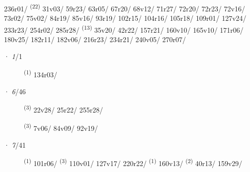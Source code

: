 \begin{description}
\mbox{236r01/} \textsuperscript{(22)} \mbox{31v03/} \mbox{59r23/} \mbox{63r05/} \mbox{67r20/} \mbox{68v12/} \mbox{71r27/} \mbox{72r20/} \mbox{72r23/} \mbox{72v16/} \mbox{73r02/} \mbox{75v02/} \mbox{84r19/} \mbox{85v16/} \mbox{93r19/} \mbox{102r15/} \mbox{104r16/} \mbox{105r18/} \mbox{109r01/} \mbox{127v24/} \mbox{233r23/} \mbox{254r02/} \mbox{285r28/} \textsuperscript{(13)} \mbox{35v20/} \mbox{42r22/} \mbox{157r21/} \mbox{160v10/} \mbox{165v10/} \mbox{171r06/} \mbox{180v25/} \mbox{182r11/} \mbox{182v06/} \mbox{216r23/} \mbox{234r21/} \mbox{240v05/} \mbox{270r07/}
\end{description}
\ENTRYEND
\noindent{} · \textit{1}/1 \LEMMALINE
\begin{description}
    \item[]  \textsuperscript{(1)} \mbox{134r03/}
\end{description}
\ENTRYEND
\noindent{} · \textit{6}/46 \LEMMALINE
\begin{description}
    \item[]  \textsuperscript{(3)} \mbox{22v28/} \mbox{25r22/} \mbox{255r28/}
    \item[]  \textsuperscript{(3)} \mbox{7v06/} \mbox{84v09/} \mbox{92v19/}
\end{description}
\ENTRYEND
\noindent{} · \textit{7}/41 \LEMMALINE
\begin{description}
    \item[]  \textsuperscript{(1)} \mbox{101r06/} \textsuperscript{(3)} \mbox{110v01/} \mbox{127v17/} \mbox{220r22/} \textsuperscript{(1)} \mbox{160v13/} \CASEBREAK {} \textsuperscript{(2)} \mbox{40r13/} \mbox{159v29/}
\end{description}
